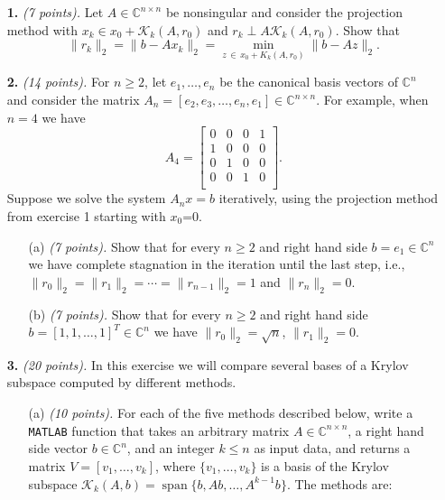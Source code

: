 \documentclass[10pt]{report}
\begin{document}
\begin{enumerate}
\item[\textbf{1.}] \textit{(7 points).} Let $A \in \mathbb{C}^{n \times n}$ be nonsingular and consider the projection method with $x_k \in x_0 + \mathcal{K}_k(A,r_0)$ and \linebreak $r_k \perp A \mathcal{K}_k(A,r_0)$. Show that \[\|r_{k}\|_2=\|b-Ax_k\|_2=\min_{z \,\in \, x_0+K_k(A,r_0)}\|b-Az\|_2.\]

\vspace{0.1cm} 

\item[\textbf{2.}] \textit{(14 points).} For $n \geq 2$, let  $e_1, \ldots, e_n$ be the  canonical basis vectors of $\mathbb{C}^n$ and consider the matrix 
$A_n=[e_2,e_3,\ldots ,e_n,e_1] \in \mathbb{C}^{n \times n}$. For example, when $n=4$ we have
\[  A_4 = \left[\begin{array}{cccc}
0 & 0 & 0 & 1 \\ 
1 & 0 & 0 & 0 \\
0 & 1 & 0 & 0 \\
0 & 0 & 1 & 0 \\
\end{array} \right].\]
Suppose we  solve the system $A_nx=b$ iteratively, using the projection method from exercise 1 starting with $x_0$=0.
\begin{itemize}
\item[(a)] \textit{(7 points).} Show that for every $n \geq 2$ and right hand side $b=e_1 \in \mathbb{C}^n$ we have complete stagnation in the iteration until the last step, i.e., $\|r_0\|_2 = \|r_1\|_2=\cdots =\|r_{n-1}\|_2=1$ and $\|r_n\|_2=0$.
\item[(b)] \textit{(7 points).} Show that for every $n \geq 2$ and right hand side $b=[1, 1, \ldots, 1]^T \in \mathbb{C}^n$ we have $\|r_0\|_2=\sqrt{n}$, $\|r_1\|_2=0.$
\end{itemize}  

\item[\textbf{3.}] \textit{(20 points).} In this exercise we will compare several bases of a Krylov subspace computed by different methods.  

\begin{itemize}
\item[(a)] \textit{(10 points).} For each of the five methods described below, write a \verb+MATLAB+ function that takes an arbitrary matrix $A \in \mathbb{C}^{n \times n}$, a right hand side vector $b\in \mathbb{C}^n$,  and an integer $k \leq n$ as input data, and returns a matrix $V=[v_1,\ldots,v_k]$, where $\{v_1, \ldots, v_k\}$ is a basis of the Krylov subspace $\mathcal{K}_k(A,b)= \operatorname{span}\{b, Ab, \ldots, A^{k-1}b\}.$ The methods are:


\end{itemize}
\end{enumerate}
\end{document}
